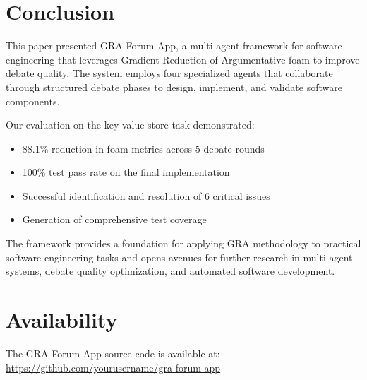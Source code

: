 \documentclass[12pt,a4paper]{article}
\begin{document}
\section{Conclusion}

This paper presented GRA Forum App, a multi-agent framework for software engineering that leverages Gradient Reduction of Argumentative foam to improve debate quality. The system employs four specialized agents that collaborate through structured debate phases to design, implement, and validate software components.

Our evaluation on the key-value store task demonstrated:
\begin{itemize}
    \item 88.1\% reduction in foam metrics across 5 debate rounds
    \item 100\% test pass rate on the final implementation
    \item Successful identification and resolution of 6 critical issues
    \item Generation of comprehensive test coverage
\end{itemize}

The framework provides a foundation for applying GRA methodology to practical software engineering tasks and opens avenues for further research in multi-agent systems, debate quality optimization, and automated software development.

\section*{Availability}

The GRA Forum App source code is available at:
\url{https://github.com/yourusername/gra-forum-app}
\end{document}
